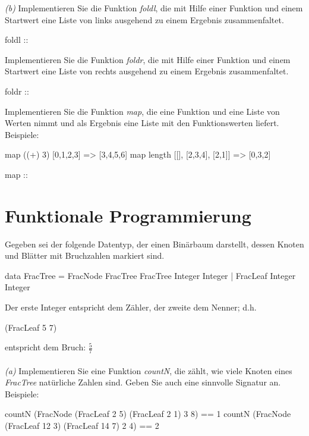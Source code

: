 \documentclass[11pt,a4paper,oneside,ngerman]{scrbook}
\begin{document}
\emph{(b)} Implementieren Sie die Funktion \emph{foldl}, die mit Hilfe einer Funktion und einem Startwert eine Liste von links ausgehend zu einem Ergebnis zusammenfaltet.

\begin{code}
  foldl :: 


\end{code}

Implementieren Sie die Funktion \emph{foldr}, die mit Hilfe einer Funktion und einem Startwert eine Liste von rechts ausgehend zu einem Ergebnis zusammenfaltet.

\begin{code}
  foldr :: 


\end{code}

Implementieren Sie die Funktion \emph{map}, die eine Funktion und eine Liste von Werten nimmt und als Ergebnis eine Liste mit den Funktionswerten liefert. Beispiele:
\begin{code}
  map ((+) 3) [0,1,2,3]             => [3,4,5,6]
  map length [[], [2,3,4], [2,1]]   => [0,3,2]

  map :: 


\end{code}

\newpage



\section{Funktionale Programmierung}
Gegeben sei der folgende Datentyp, der einen Binärbaum darstellt, dessen Knoten und Blätter mit Bruchzahlen markiert sind.

\begin{code}
data FracTree = FracNode FracTree FracTree Integer Integer 
              | FracLeaf Integer Integer
\end{code}

Der erste Integer entspricht dem Zähler, der zweite dem Nenner; d.h.
\begin{code} 
(FracLeaf 5 7)
\end{code}
entspricht dem Bruch: $\frac57$
\\
\\
\emph{(a)} Implementieren Sie eine Funktion \emph{countN}, die zählt, wie viele Knoten eines \emph{FracTree} natürliche Zahlen sind. Geben Sie auch eine sinnvolle Signatur an.
Beispiele:
\begin{code}
  countN (FracNode (FracLeaf 2 5) (FracLeaf 2 1) 3 8) == 1
  countN (FracNode (FracLeaf 12 3) (FracLeaf 14 7) 2 4) == 2







\end{code}
\end{document}
